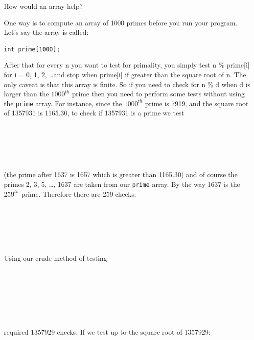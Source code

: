 How would an array help?

One way is to compute an array of 1000 primes before you run your program. Let's say the array is called:

\begin{center}
\texttt{int prime[1000];}
\end{center}

After that for every n you want to test for primality, you simply test n \% prime[i] for i = 0, 1, 2, \ldots and stop when prime[i] if greater than the square root of n. The only caveat is that this array is finite. So if you need to check for n \% d when d is larger than the $1000^{th}$ prime then you need to perform some tests without using the \texttt{prime} array. For instance, since the $1000^{th}$ prime is 7919, and the square root of 1357931 is 1165.30, to check if 1357931 is a prime we test

\\
\\
\\
\tab[3em]{\vdots}\\

(the prime after 1637 is 1657 which is greater than 1165.30) and of course the primes 2, 3, 5, \ldots, 1637 are taken from our \texttt{prime} array. By the way 1637 is the $259^{th}$ prime. Therefore there are 259 checks:

\\
\\
\\
\tab[3em]{\vdots}\\
\\

Using our crude method of testing

\\
\\
\\
\\
\tab[3em]{\vdots}\\
\\

required 1357929 checks. If we test up to the square root of 1357929:

\\
\\
\\
\\
\\
\\

